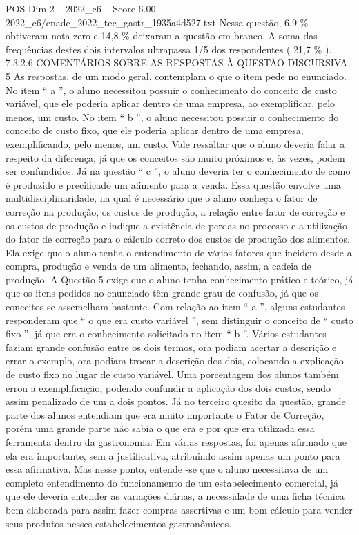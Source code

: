 \begin{textsample}{POS Dim 2 – 2022\_c6 – Score 6.00 – 2022\_c6/enade\_2022\_tec\_gastr\_1935a4d527.txt}
Nessa questão, 6,9 \% obtiveram nota zero e 14,8 \% deixaram a questão em branco.
A soma das frequências destes dois intervalos ultrapassa 1/5 dos respondentes ( 21,7 \% ). 7.3.2.6 COMENTÁRIOS SOBRE AS RESPOSTAS À QUESTÃO DISCURSIVA 5 As respostas, de um modo geral, contemplam o que o item pede no enunciado.
No item “ a ”, o aluno necessitou possuir o conhecimento do conceito de custo variável, que ele poderia aplicar dentro de uma empresa, ao exemplificar, pelo menos, um custo.
No item “ b ”, o aluno necessitou possuir o conhecimento do conceito de custo fixo, que ele poderia aplicar dentro de uma empresa, exemplificando, pelo menos, um custo.
Vale ressaltar que o aluno deveria falar a respeito da diferença, já que os conceitos são muito próximos e, às vezes, podem ser confundidos.
Já na questão “ c ”, o aluno deveria ter o conhecimento de como é produzido e precificado um alimento para a venda.
Essa questão envolve uma multidisciplinaridade, na qual é necessário que o aluno conheça o fator de correção na produção, os custos de produção, a relação entre fator de correção e os custos de produção e indique a existência de perdas no processo e a utilização do fator de correção para o cálculo correto dos custos de produção dos alimentos.
Ela exige que o aluno tenha o entendimento de vários fatores que incidem desde a compra, produção e venda de um alimento, fechando, assim, a cadeia de produção.
A Questão 5 exige que o aluno tenha conhecimento prático e teórico, já que os itens pedidos no enunciado têm grande grau de confusão, já que os conceitos se assemelham bastante.
Com relação ao item “ a ”, alguns estudantes responderam que “ o que era custo variável ”, sem distinguir o conceito de “ custo fixo ”, já que era o conhecimento solicitado no item “ b ”.
Vários estudantes faziam grande confusão entre os dois termos, ora podiam acertar a descrição e errar o exemplo, ora podiam trocar a descrição dos dois, colocando a explicação de custo fixo no lugar de custo variável.
Uma porcentagem dos alunos também errou a exemplificação, podendo confundir a aplicação dos dois custos, sendo assim penalizado de um a dois pontos.
Já no terceiro quesito da questão, grande parte dos alunos entendiam que era muito importante o Fator de Correção, porém uma grande parte não sabia o que era e por que era utilizada essa ferramenta dentro da gastronomia.
Em várias respostas, foi apenas afirmado que ela era importante, sem a justificativa, atribuindo assim apenas um ponto para essa afirmativa.
Mas nesse ponto, entende -se que o aluno necessitava de um completo entendimento do funcionamento de um estabelecimento comercial, já que ele deveria entender as variações diárias, a necessidade de uma ficha técnica bem elaborada para assim fazer compras assertivas e um bom cálculo para vender seus produtos nesses estabelecimentos gastronômicos.

\end{textsample}
